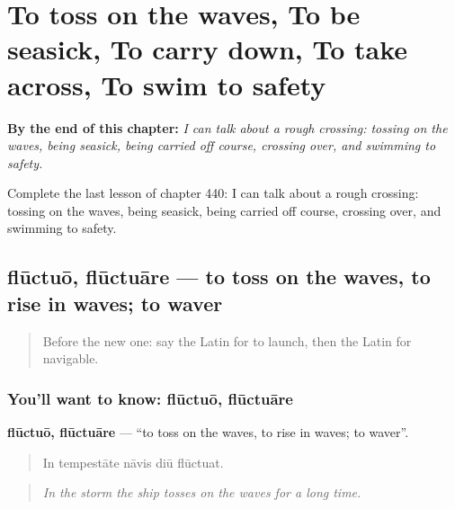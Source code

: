 
\chapter{To toss on the waves, To be seasick, To carry down, To take across, To swim to safety}
\label{ch:la-to-toss-on-the-waves-to-be-seasick-to-carry-down-to-take-across-to-swim-to-safety}

\begin{chapteropening}
\textbf{By the end of this chapter:} \emph{I can talk about a rough crossing: tossing on the waves, being seasick, being carried off course, crossing over, and swimming to safety.}

Complete the last lesson of chapter 440: I can talk about a rough crossing: tossing on the waves, being seasick, being carried off course, crossing over, and swimming to safety.
\end{chapteropening}

\section[flūctuō, flūctuāre]{flūctuō, flūctuāre — to toss on the waves, to rise in waves; to waver}

\label{lesson:LA-C440-fluctuo}



\begin{quote}
Before the new one: say the Latin for to launch, then the Latin for navigable.
\end{quote}

\subsection*{You'll want to know: flūctuō, flūctuāre}
\textbf{flūctuō, flūctuāre} — \textquotedblleft{}to toss on the waves, to rise in waves; to waver\textquotedblright{}.

\begin{quote}
In tempestāte nāvis diū flūctuat.
\end{quote}

\begin{quote}
\emph{In the storm the ship tosses on the waves for a long time.}
\end{quote}

